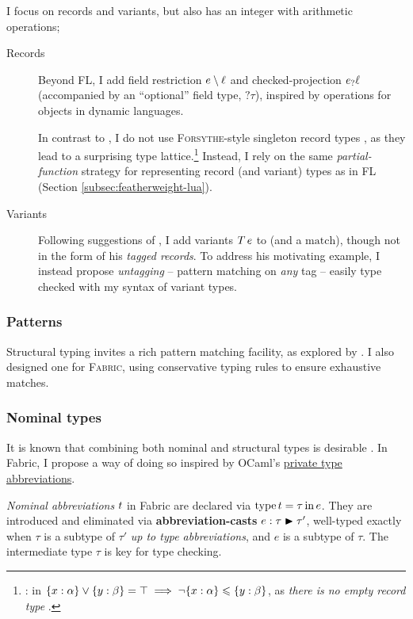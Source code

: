 I focus on records and variants, but \fabric{} also has an integer with arithmetic operations;
\begin{description}
\item[Records]
Beyond FL, I add field restriction $e \setminus \ell$ \cite{operations-on-records} and checked-projection ${e}_?{\ell}$ (accompanied by an \enquote{optional} field type, $?\boxed{\tau}$), inspired by operations for objects in dynamic languages.

In contrast to \textcite{mlstruct}, I do not use \textsc{Forsythe}-style singleton record types \cite{forsythe}, as they lead to a surprising type lattice.\footnote{\eg{}: in \mlstruct{} $\flrec{x : \alpha} \join \flrec{y: \beta} = \top \implies \comp \flrec{ x : \alpha } \sub \flrec{ y : \beta } $, as \emph{there is no empty record type} \cite[Section~4.4.5]{mlstruct}.} Instead, I rely on the same \emph{partial-function} strategy for representing record (and variant) types as in FL (Section \ref{subsec:featherweight-lua}).

\item[Variants] Following suggestions of \textcite[Section~9.2]{dolan-thesis}, I add variants $T\,e$ to \fabric{} (and a $\mathrm{match}$), though not in the form of his \emph{tagged records}. To address his motivating example, I instead propose \emph{untagging} -- pattern matching on \emph{any} tag -- easily type checked with my syntax of variant types.
\end{description}

\subsubsection{Patterns}
Structural typing invites a rich pattern matching facility, as explored by \eg{} \textcite{parreaux-patterns}. I also designed one for \textsc{Fabric}, using conservative typing rules to ensure exhaustive matches. 

\subsubsection{Nominal types} 
It is known that combining both nominal and structural types is desirable \cite{mlstruct, integrating-nominal-and-structural}. In Fabric, I propose a way of doing so inspired by OCaml's \href{https://ocaml.org/manual/5.1/privatetypes.html#ss:private-types-abbrev}{private type abbreviations}.

\emph{Nominal abbreviations} $t$ in Fabric are declared via $\mathrm{type}\,t=\tau\,\mathrm{in}\,e$. They are introduced and eliminated via \textbf{abbreviation-casts} ${e} : {\tau} \blacktriangleright {\tau'}$, well-typed exactly when $\tau$ is a subtype of $\tau'$ \emph{up to type abbreviations}, and $e$ is a subtype of $\tau$. The intermediate type $\tau$ is key for type checking.

